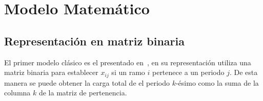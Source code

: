 \documentclass[letterpaper,10pt]{article}
\begin{document}
\section{Modelo Matemático}

\subsection{Representación en matriz binaria}
El primer modelo clásico es el presentado en~\cite{DBLP:journals/corr/cs-PL-0110007}, en su representación utiliza una matriz binaria para establecer $x_{ij}$ si un ramo $i$ pertenece a un periodo $j$. De esta manera se puede obtener la carga total de el periodo $k$-ésimo como la suma de la columna $k$ de la matriz de pertenencia.
\end{document}
